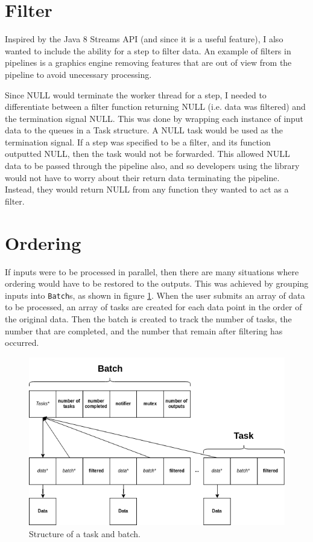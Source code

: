 \documentclass[12pt]{article}
\def\code#1{\texttt{#1}}
\begin{document}
\section{Filter}

Inspired by the Java 8 Streams API (and since it is a useful feature), I also wanted to include the ability for a step to filter data. An example of filters in pipelines is a graphics engine removing features that are out of view from the pipeline to avoid unecessary processing. 

Since NULL would terminate the worker thread for a step, I needed to differentiate between a filter function returning NULL (i.e. data was filtered) and the termination signal NULL. This was done by wrapping each instance of input data to the queues in a Task structure. A NULL task would be used as the termination signal. If a step was specified to be a filter, and its function outputted NULL, then the task would not be forwarded. This allowed NULL data to be passed through the pipeline also, and so developers using the library would not have to worry about their return data terminating the pipeline. Instead, they would return NULL from any function they wanted to act as a filter. 

\section{Ordering}

If inputs were to be processed in parallel, then there are many situations where ordering would have to be restored to the outputs. This was achieved by grouping inputs into \code{Batch}s, as shown in figure \ref{fig:batch}. When the user submits an array of data to be processed, an array of tasks are created for each data point in the order of the original data. Then the batch is created to track the number of tasks, the number that are completed, and the number that remain after filtering has occurred.

\begin{figure}[!ht]
	\centering 
	\includegraphics[width=0.8\linewidth]{images/batch}
	\caption{Structure of a task and batch.}
	\label{fig:batch}
\end{figure}
\end{document}
